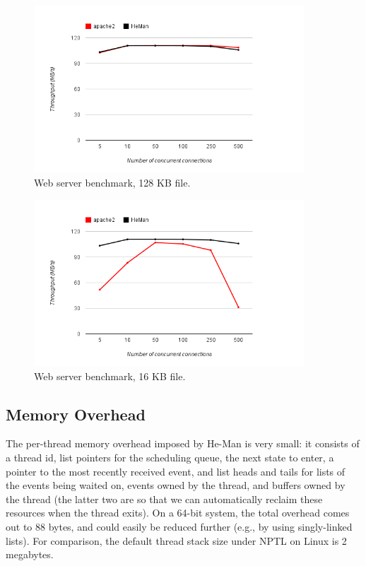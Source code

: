 \documentclass[preprint]{sigplanconf}
\begin{document}
\begin{figure}[!ht]
\centering
\includegraphics[width=0.9\textwidth]{128kb_graph.png}
\caption{Web server benchmark, 128 KB file.}
\label{fig:graph128}
\end{figure}
\begin{figure}[!ht]
\centering
\includegraphics[width=0.9\textwidth]{16kb_graph.png}
\caption{Web server benchmark, 16 KB file.}
\label{fig:graph16}
\end{figure}

\subsection{Memory Overhead}

The per-thread memory overhead imposed by He-Man is very small: it
consists of a thread id, list pointers for the scheduling queue, the
next state to enter, a pointer to the most recently received event,
and list heads and tails for lists of the events being waited on,
events owned by the thread, and buffers owned by the thread (the
latter two are so that we can automatically reclaim these resources
when the thread exits). On a 64-bit system, the total overhead comes
out to 88 bytes, and could easily be reduced further (e.g., by using
singly-linked lists).  For comparison, the default thread stack size
under NPTL on Linux is 2 megabytes.
\end{document}
